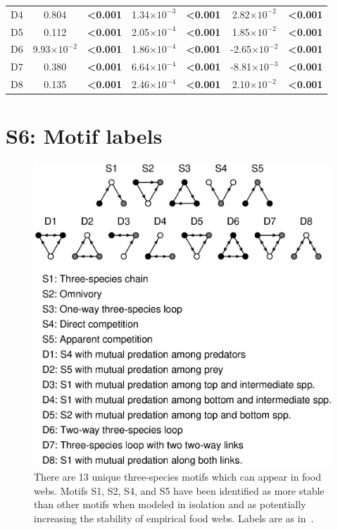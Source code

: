 \documentclass[12pt]{article}
\begin{document}
\begin{spacing}{2.0}
\begin{table}[h!]
\begin{tabular}{l | c c c c c c }
        D4	&	0.804	&	\textbf{\textless0.001}	&	1.34$\times10^{-3}$	&	\textbf{\textless0.001}	&	2.82$\times10^{-2}$	&	\textbf{\textless0.001}	\\
        D5	&	0.112	&	\textbf{\textless0.001}	&	2.05$\times10^{-4}$	&	\textbf{\textless0.001}	&	1.85$\times10^{-2}$	&	\textbf{\textless0.001}	\\
        D6	&	9.93$\times10^{-2}$	&	\textbf{\textless0.001}	&	1.86$\times10^{-4}$	&	\textbf{\textless0.001}	&	-2.65$\times10^{-2}$	&	\textbf{\textless0.001}	\\
        D7	&	0.380	&	\textbf{\textless0.001}	&	6.64$\times10^{-4}$	&	\textbf{\textless0.001}	&	-8.81$\times10^{-3}$	&	\textbf{\textless0.001}	\\
        D8	&	0.135	&	\textbf{\textless0.001}	&	2.46$\times10^{-4}$	&	\textbf{\textless0.001}	&	2.10$\times10^{-2}$	&	\textbf{\textless0.001}	\\
        \hline
        \end{tabular}
        \end{table}
        

\clearpage

\section*{S6: Motif labels}

	\begin{figure}[h!]
		\caption{There are 13 unique three-species motifs which can appear in food webs. Motifs S1, S2, S4, and S5 have been identified as more stable than other motifs when modeled in isolation and as potentially increasing the stability of empirical food webs. Labels are as in~\citet{Stouffer2007}.}
		\label{motifs}
		\includegraphics[width=.8\textwidth]{figures/motifs.eps}
		\end{figure}

\end{spacing}
\clearpage

     
\end{document}
